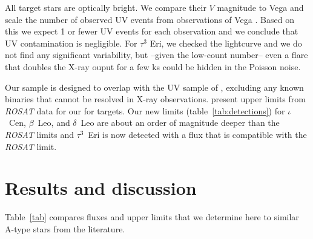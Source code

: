 \documentclass[preprint2]{aastex631}
\begin{document}
All target stars are optically bright. We compare their $V$ magnitude
to Vega and scale the number of observed UV events from observations
of Vega \citep{2006ApJ...636..426P}. Based on this we expect 1 or fewer UV
events for each observation and we conclude that UV contamination is
negligible. For $\tau^3$ Eri, we checked the lightcurve and we do not find any significant variability, but --given the low-count number-- even a flare that doubles the X-ray ouput for a few ks could be hidden in the Poisson noise.

Our sample is designed to overlap with the UV sample of
\cite{2002ApJ...579..800S}, excluding any known binaries that cannot
be resolved in X-ray observations. \cite{2002ApJ...579..800S} present
upper limits from \emph{ROSAT} data for our for targets. Our new
limits (table~\ref{tab:detections}) for $\iota$~Cen, $\beta$~Leo, and
$\delta$~Leo are about an order of magnitude deeper than the
\emph{ROSAT} limits and $\tau^3$~Eri is now detected with a flux that
is compatible with the \emph{ROSAT} limit.

\section{Results and discussion}  \label{sec:discussion}
Table~\ref{tab} compares fluxes and upper limits that we determine here to similar A-type stars from the literature.
\end{document}
